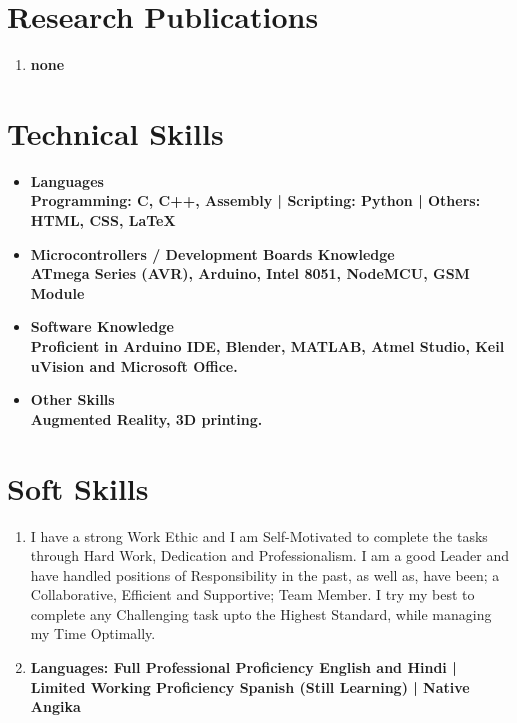 \documentclass[11pt]{article}
\begin{document}
\begin{minipage}{18cm}
\begin{itemize}[leftmargin=*]
\end{itemize}

\section{Research Publications}
\begin{enumerate}[leftmargin=*]
\item \bfseries none\\
\end{enumerate}

\section{Technical Skills}
\begin{itemize}[leftmargin=*]
\item \bfseries Languages\\
Programming: \mdseries C, C++, Assembly | 
\bfseries Scripting: \mdseries Python | 
\bfseries Others: \mdseries HTML, CSS, \LaTeX\\

\item \bfseries Microcontrollers / Development Boards Knowledge\\
\mdseries ATmega Series (AVR), Arduino, Intel 8051, NodeMCU, GSM Module\\

\item \bfseries Software Knowledge\\
\mdseries Proficient in Arduino IDE, Blender, MATLAB, Atmel Studio, Keil uVision and Microsoft Office.\\

\item \bfseries Other Skills\\
\mdseries Augmented Reality, 3D printing.\\
\end{itemize}

\fontsize{10pt}{13pt}\selectfont
\section{Soft Skills}
\begin{enumerate}[leftmargin=*]
\item  I have a strong Work Ethic and I am Self-Motivated to complete the tasks through Hard Work, Dedication and Professionalism. I am a good Leader and have handled positions of Responsibility in the past, as well as, have been; a Collaborative, Efficient and Supportive; Team Member. I try my best to complete any Challenging task upto the Highest Standard, while managing my Time Optimally.\\

\item \bfseries Languages: 
Full Professional Proficiency \mdseries English and Hindi | \bfseries Limited Working Proficiency \mdseries Spanish (Still Learning) | \bfseries Native \mdseries Angika
\end{enumerate}

\end{minipage}
\pagebreak
\end{document}
